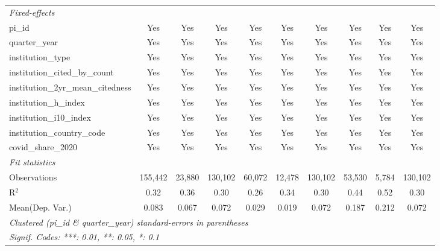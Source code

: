 \begin{tabular}{lccccccccc}
   \midrule
   \emph{Fixed-effects}\\
   pi\_id                                                      & Yes            & Yes            & Yes            & Yes            & Yes           & Yes            & Yes            & Yes           & Yes\\  
   quarter\_year                                               & Yes            & Yes            & Yes            & Yes            & Yes           & Yes            & Yes            & Yes           & Yes\\  
   institution\_type                                           & Yes            & Yes            & Yes            & Yes            & Yes           & Yes            & Yes            & Yes           & Yes\\  
   institution\_cited\_by\_count                               & Yes            & Yes            & Yes            & Yes            & Yes           & Yes            & Yes            & Yes           & Yes\\  
   institution\_2yr\_mean\_citedness                           & Yes            & Yes            & Yes            & Yes            & Yes           & Yes            & Yes            & Yes           & Yes\\  
   institution\_h\_index                                       & Yes            & Yes            & Yes            & Yes            & Yes           & Yes            & Yes            & Yes           & Yes\\  
   institution\_i10\_index                                     & Yes            & Yes            & Yes            & Yes            & Yes           & Yes            & Yes            & Yes           & Yes\\  
   institution\_country\_code                                  & Yes            & Yes            & Yes            & Yes            & Yes           & Yes            & Yes            & Yes           & Yes\\  
   covid\_share\_2020                                          & Yes            & Yes            & Yes            & Yes            & Yes           & Yes            & Yes            & Yes           & Yes\\  
   \midrule
   \emph{Fit statistics}\\
   Observations                                                & 155,442        & 23,880         & 130,102        & 60,072         & 12,478        & 130,102        & 53,530         & 5,784         & 130,102\\  
   R$^2$                                                       & 0.32           & 0.36           & 0.30           & 0.26           & 0.34          & 0.30           & 0.44           & 0.52          & 0.30\\  
Mean(Dep. Var.) & 0.083 & 0.067 & 0.072 & 0.029 & 0.019 & 0.072 & 0.187 & 0.212 & 0.072 \\
   \midrule \midrule
   \multicolumn{10}{l}{\emph{Clustered (pi\_id \& quarter\_year) standard-errors in parentheses}}\\
   \multicolumn{10}{l}{\emph{Signif. Codes: ***: 0.01, **: 0.05, *: 0.1}}\\
\end{tabular}
\par\endgroup
